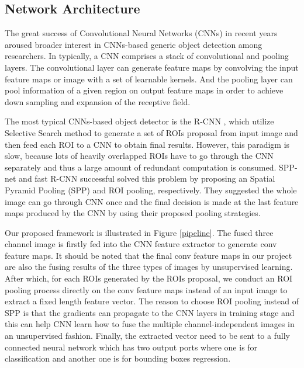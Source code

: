 \documentclass[journal]{IEEEtran}
\begin{document}
\subsection{Network Architecture}
The great success of Convolutional Neural Networks (CNNs) in recent years aroused broader interest in CNNs-based generic object detection among researchers. In typically, a CNN comprises a stack of convolutional and pooling layers. The convolutional layer can generate feature maps by convolving the input feature maps or image with a set of learnable kernels. And the pooling layer can pool information of a given region on output feature maps in order to achieve down sampling and expansion of the receptive field.	

The most typical CNNs-based object detector is the R-CNN \cite{GirshickRichSegmentation}, which utilize Selective Search method to generate a set of ROIs proposal from input image and then feed each ROI to a CNN to obtain final results. However, this paradigm is slow, because lots of heavily overlapped ROIs have to go through the CNN separately and thus a large amount of redundant computation is consumed. SPP-net \cite{He2015} and fast R-CNN \cite{Girshick2016} successful solved this problem by proposing an Spatial Pyramid Pooling (SPP) and ROI pooling, respectively. They suggested the whole image can go through CNN once and the final decision is made at the last feature maps produced by the CNN by using their proposed pooling strategies.

Our proposed framework is illustrated in Figure \ref{pipeline}. The fused three channel image is firstly fed into the CNN feature extractor to generate conv feature maps. It should be noted that the final conv feature maps in our project are also the fusing results of the three types of images by unsupervised learning. After which, for each ROIs generated by the ROIs proposal, we conduct an ROI pooling process directly on the conv feature maps instead of an input image to extract a fixed length feature vector. The reason to choose ROI pooling instead of SPP is that the gradients can propagate to the CNN layers in training stage and this can help CNN learn how to fuse the multiple channel-independent images in an unsupervised fashion. Finally, the extracted vector need to be sent to a fully connected neural network which has two output ports where one is for classification and another one is for bounding boxes regression. 
\end{document}
